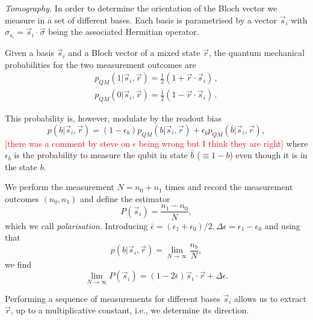 \documentclass[two column]{article}
\newcommand{\caro}[1]{\textcolor{red}{[#1]}}
\begin{document}
\emph{Tomography.} In order to determine the orientation of the Bloch vector we measure in a set of different bases. Each basis is parametrised by a vector $\vec{s}_i$ with $\sigma_{s_i} = \vec{s}_i \cdot \vec{\sigma}$ being the associated Hermitian operator.

Given a basis $\vec{s}_i$ and a Bloch vector of a mixed state $\vec{r}$, the quantum mechanical probabilities for the two measurement outcomes are
\begin{equation}\label{eqn:probs}
\begin{split}
p_{QM}(1|\vec{s}_i, \vec{r}) = \frac{1}{2}(1+\vec{r}\cdot\vec{s}_i)\,,\\
p_{QM}(0|\vec{s}_i, \vec{r}) = \frac{1}{2}(1-\vec{r}\cdot\vec{s}_i)\,.
\end{split}
\end{equation}

This probability is, however, modulate by the readout bias
\begin{equation}
    p(b|\vec{s}_i, \vec{r}) = (1-\epsilon_b)p_{QM}(b|\vec{s}_i, \vec{r}) + \epsilon_{\bar{b}} p_{QM}(\bar{b}|\vec{s}_i, \vec{r}), \label{eqn:marg}
\end{equation}
\caro{there was a comment by steve on $\epsilon$ being wrong but I think they are right}
where $\epsilon_b$ is the probability to measure the qubit in state $\bar{b}$ ($\equiv 1-b$) even though it is in the state $b$.


We perform the measurement $N=n_0 + n_1$ times and record the measurement outcomes $(n_0, n_1)$ and define the estimator 
\begin{equation}
    P(\vec{s}_i) = \frac{n_1-n_0}{N},
\end{equation}
which we call \emph{polarisation}.
Introducing $\bar \epsilon = (\epsilon_1+\epsilon_0)/2, \Delta \epsilon = \epsilon_1-\epsilon_0$ and using that 
$$p(b|\vec{s}_i, \vec{r})=\lim_{N\to \infty} \frac{n_b}{N},$$
we find \begin{equation}
\lim_{N \to \infty} P(\vec{s}_i)=(1-2\bar\epsilon)\vec{s}_i \cdot \vec{r} + \Delta\epsilon.\label{eqn:estim}
\end{equation}
 
Performing a sequence of measurements for different bases $\vec{s}_i$ allows us to extract $\vec{r}$, up to a multiplicative constant, i.e., we determine its direction.
\end{document}
